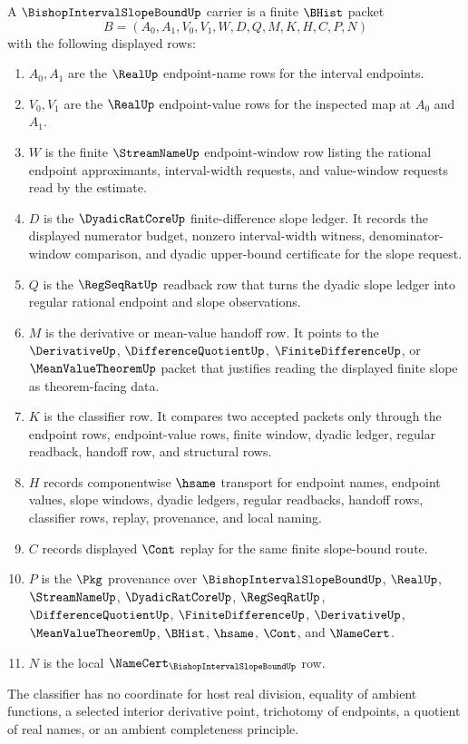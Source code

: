 \begin{definition}
\label{def:bishop-slope-bound-carrier}
A $\BishopIntervalSlopeBoundUp$ carrier is a finite $\BHist$ packet
$$
B=(A_0,A_1,V_0,V_1,W,D,Q,M,K,H,C,P,N)
$$
with the following displayed rows:
\begin{enumerate}
\item $A_0,A_1$ are the $\RealUp$ endpoint-name rows for the interval endpoints.
\item $V_0,V_1$ are the $\RealUp$ endpoint-value rows for the inspected map at $A_0$ and $A_1$.
\item $W$ is the finite $\StreamNameUp$ endpoint-window row listing the rational endpoint approximants, interval-width requests, and value-window requests read by the estimate.
\item $D$ is the $\DyadicRatCoreUp$ finite-difference slope ledger. It records the displayed numerator budget, nonzero interval-width witness, denominator-window comparison, and dyadic upper-bound certificate for the slope request.
\item $Q$ is the $\RegSeqRatUp$ readback row that turns the dyadic slope ledger into regular rational endpoint and slope observations.
\item $M$ is the derivative or mean-value handoff row. It points to the $\DerivativeUp$, $\DifferenceQuotientUp$, $\FiniteDifferenceUp$, or $\MeanValueTheoremUp$ packet that justifies reading the displayed finite slope as theorem-facing data.
\item $K$ is the classifier row. It compares two accepted packets only through the endpoint rows, endpoint-value rows, finite window, dyadic ledger, regular readback, handoff row, and structural rows.
\item $H$ records componentwise $\hsame$ transport for endpoint names, endpoint values, slope windows, dyadic ledgers, regular readbacks, handoff rows, classifier rows, replay, provenance, and local naming.
\item $C$ records displayed $\Cont$ replay for the same finite slope-bound route.
\item $P$ is the $\Pkg$ provenance over $\BishopIntervalSlopeBoundUp$, $\RealUp$, $\StreamNameUp$, $\DyadicRatCoreUp$, $\RegSeqRatUp$, $\DifferenceQuotientUp$, $\FiniteDifferenceUp$, $\DerivativeUp$, $\MeanValueTheoremUp$, $\BHist$, $\hsame$, $\Cont$, and $\NameCert$.
\item $N$ is the local $\NameCert_{\BishopIntervalSlopeBoundUp}$ row.
\end{enumerate}
The classifier has no coordinate for host real division, equality of ambient functions, a selected interior derivative point, trichotomy of endpoints, a quotient of real names, or an ambient completeness principle.
\end{definition}

